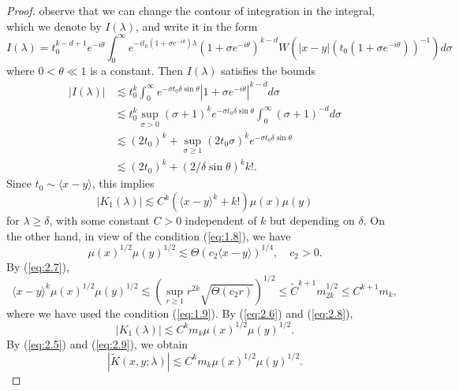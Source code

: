 \documentclass[11pt]{amsart}
\numberwithin{equation}{section}
\begin{document}
\begin{proof}
 observe that we can change the contour of integration in the integral, which
 we denote by $I(\lambda)$, and write it in the form
 \begin{equation*}
 I(\lambda)=t_0^{k-d+1} e^{-i \theta}\int_{0}^\infty e^{-it_0(1+\sigma e^{-i\theta})\lambda}
 (1+\sigma e^{-i\theta})^{k-d}W(|x-y|(t_0(1+\sigma e^{-i\theta}))^{-1})d\sigma
 \end{equation*}
 where $0<\theta\ll 1$ is a constant. Then 
 $I(\lambda)$ satisfies the bounds
 \begin{equation*}
 \begin{split}
 |I(\lambda)|&\lesssim t_0^{k}\int_{0}^\infty e^{-\sigma t_0\delta\sin\theta}
 |1+\sigma e^{-i\theta}|^{k-d}d\sigma\\
 &\lesssim t_0^{k}\sup_{\sigma>0}(\sigma+1)^ke^{-\sigma t_0\delta\sin\theta}\int_0^\infty(\sigma+1)^{-d}d\sigma\\
 &\lesssim (2t_0)^{k}+\sup_{\sigma\ge 1}(2t_0\sigma)^ke^{-\sigma t_0\delta\sin\theta}\\
  &\lesssim (2t_0)^{k}+(2/\delta\sin\theta)^kk!.
 \end{split}
 \end{equation*}
 Since $t_0\sim \langle x-y\rangle$, this implies 
 \begin{equation}\label{eq:2.6}
 |K_1(\lambda)|\lesssim C^k\left(\langle x-y\rangle^{k}+k!\right)\mu(x)\mu(y)
 \end{equation}
 for $\lambda\ge\delta$, with some constant $C>0$ independent of $k$ but depending on $\delta$. 
 On the other hand, in view of the condition (\ref{eq:1.8}), we have 
  \begin{equation}\label{eq:2.7}
  \mu(x)^{1/2}\mu(y)^{1/2}\lesssim \Theta(c_2\langle x-y\rangle)^{1/4},\quad c_2>0.
   \end{equation}
   By (\ref{eq:2.7}),
   \begin{equation}\label{eq:2.8}
   \langle x-y\rangle^{k}\mu(x)^{1/2}\mu(y)^{1/2}\lesssim \left(\sup_{r\ge 1}r^{2k}\sqrt{\Theta(c_2r)}\right)^{1/2}\le \widetilde C^{k+1}m_{2k}^{1/2}\le C^{k+1}m_k,
    \end{equation}
    where we have used the condition (\ref{eq:1.9}). 
     By (\ref{eq:2.6}) and (\ref{eq:2.8}),
     \begin{equation}\label{eq:2.9}
 |K_1(\lambda)|\lesssim C^km_k\mu(x)^{1/2}\mu(y)^{1/2}.
 \end{equation}
 By (\ref{eq:2.5}) and (\ref{eq:2.9}), we obtain
 \begin{equation}\label{eq:2.10}
 |\widetilde K(x,y;\lambda)|\lesssim C^km_k\mu(x)^{1/2}\mu(y)^{1/2}.

\end{equation}
\end{proof}
\end{document}
